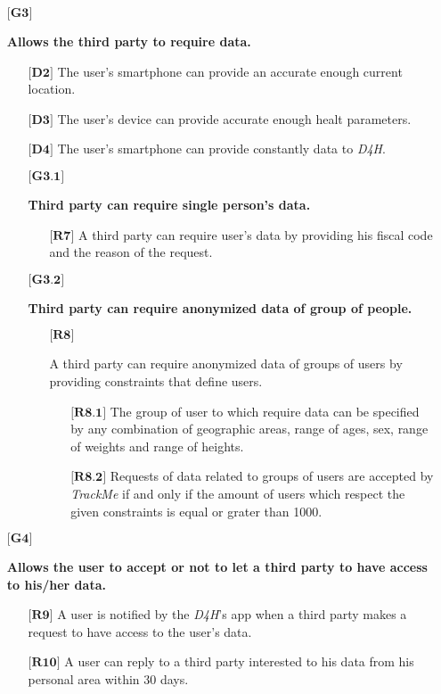 \begin{itemize}
	\item[${\textbf{[G3]}}$] {\textbf{Allows the third party to require data.}
		\begin{itemize}
			\item[$\textbf{[D2]}$] {The user's smartphone can provide an accurate enough current location.}
			\item[$\textbf{[D3]}$] {The user's device can provide accurate enough healt parameters.}
			\item[$\textbf{[D4]}$] {The user's smartphone can provide constantly data to \hbox{\emph{D4H}}.}
			\item[${\textbf{[G3.1]}}$] {\textbf{Third party can require single person's data.}
				\begin{itemize}
					\item[$\textbf{[R7]}$] {A third party can require user's data by providing his fiscal code and the reason of the request.}
				\end{itemize}}
			\item[${\textbf{[G3.2]}}$] {\textbf{Third party can require anonymized data of group of people.}
				\begin{itemize}
					\item[$\textbf{[R8]}$] {A third party can require anonymized data of groups of users by providing constraints that define users.
						\begin{itemize}
							\item[$\textbf{[R8.1]}$] {The group of user to which require data can be specified by any combination of geographic areas, range of ages, 									sex, range of weights and range of heights.}
							\item[$\textbf{[R8.2]}$] {Requests of data related  to groups of users are accepted by \hbox{\emph{TrackMe}} if and only if the amount of 									users which respect the given constraints is equal or grater than 1000.}
						\end{itemize}}
				\end{itemize}}
		\end{itemize}}


	\item[${\textbf{[G4]}}$] {\textbf{Allows the user to accept or not to let a third party to have access to his/her data.}
		\begin{itemize}	
			\item[$\textbf{[R9]}$] {A user is notified by the \hbox{\emph{D4H}}'s app when a third party makes a request to have access to the user's data.}
			\item[$\textbf{[R10]}$] {A user can reply to a third party interested to his data from his personal area within 30 days.}
		\end{itemize}}



\end{itemize}
